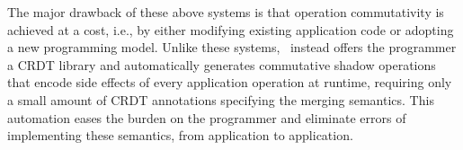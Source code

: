 The major drawback of these above systems is that operation commutativity is achieved
at a cost, i.e., by either modifying existing application code or adopting
a new programming model. Unlike these systems, 
\tool\ instead offers the programmer a CRDT library and automatically 
generates commutative shadow operations that encode side effects of every application operation at runtime, 
requiring only a small amount of CRDT annotations
specifying the merging semantics. This automation eases the burden on the programmer
and eliminate errors of implementing these semantics, from application to application.

%  
%
%  

